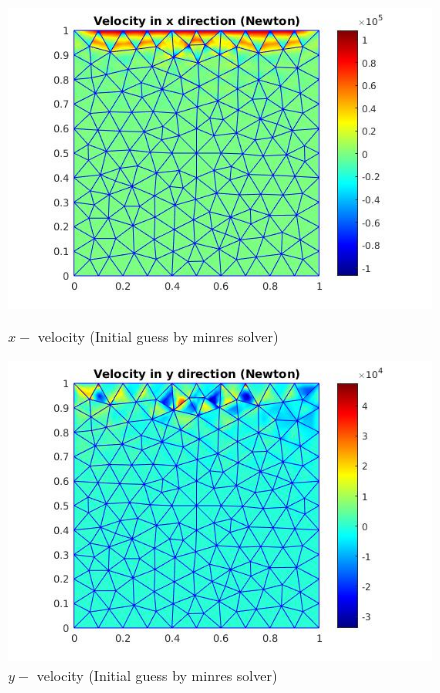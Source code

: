 \documentclass[a4paper]{book}
\begin{document}
\begin{figure}
  \begin{minipage}[c]{0.67\textwidth}
    \includegraphics[width=\textwidth]{lid_newton_vx_minres.jpg}
  \end{minipage}\hfill
  \begin{minipage}[c]{0.3\textwidth}
    \caption{$x-$ velocity (Initial guess by minres solver)}
  \label{x_vel_navier_stoke_minres_lid}
  \end{minipage}
  \begin{minipage}[c]{0.67\textwidth}
    \includegraphics[width=\textwidth]{lid_newton_vy_minres.jpg}
  \end{minipage}\hfill
  \begin{minipage}[c]{0.3\textwidth}
    \caption{$y-$ velocity (Initial guess by minres solver)}

\end{minipage}
\end{figure}
\end{document}
